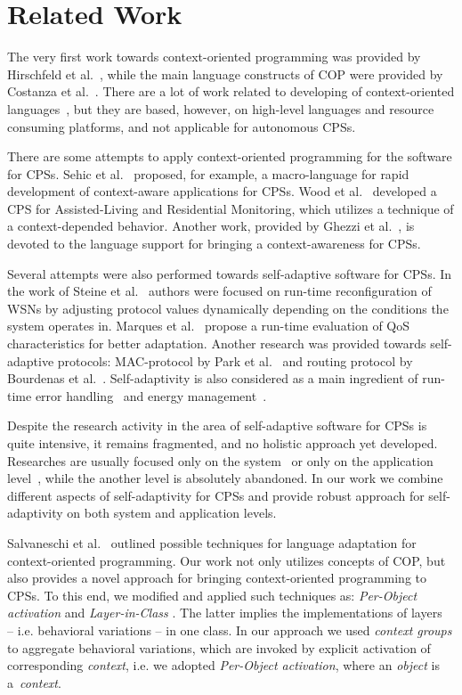 \section{Related Work}
\label{sec:related}

The very first work towards context-oriented programming was provided by
Hirschfeld et al.~\cite{Hirschfeld08}, while the main language constructs of COP
were provided by Costanza et al.~\cite{Costanza11}. There are a lot of work
related to developing of context-oriented
languages~\cite{Sehic11,Kamina11,Bardram05}, but they are based, however, on
high-level languages and resource consuming platforms, and not applicable for
autonomous CPSs.

There are some attempts to apply context-oriented programming for the software
for CPSs. Sehic et al.~\cite{Sehic11} proposed, for example, a macro-language
for rapid development of context-aware applications for CPSs. Wood et
al.~\cite{Wood08} developed a CPS for Assisted-Living and Residential
Monitoring, which utilizes a technique of a context-depended behavior. Another
work, provided by Ghezzi et al.~\cite{Ghezzi10}, is devoted to the language
support for bringing a context-awareness for CPSs.

Several attempts were also performed towards self-adaptive software for CPSs. In
the work of Steine et al.~\cite{Steine11} authors were focused on run-time
reconfiguration of WSNs by adjusting protocol values dynamically depending on
the conditions the system operates in. Marques et al.~\cite{Marques11} propose a
run-time evaluation of QoS characteristics for better adaptation. Another
research was provided towards self-adaptive protocols: MAC-protocol by Park et
al.~\cite{Park08} and routing protocol by Bourdenas et al.~\cite{Bourdenas11}.
Self-adaptivity is also considered as a main ingredient of run-time error
handling~\cite{Bourdenas10} and energy management~\cite{Jiang07}.

Despite the research activity in the area of self-adaptive software for CPSs is
quite intensive, it remains fragmented, and no holistic approach yet developed.
Researches are usually focused only on the
system~\cite{Steine11,Marques11,Park08,Bourdenas11,Bourdenas10,Jiang07} or only
on the application level~\cite{Wood08,Sehic11,Ghezzi10}, while the another level is
absolutely abandoned. In our work we combine different aspects of
self-adaptivity for CPSs and provide robust approach for self-adaptivity on both
system and application levels.

Salvaneschi et al.~\cite{Salvaneschi11,Salvaneschi12} outlined possible
techniques for language adaptation for context-oriented programming. Our work
not only utilizes concepts of COP, but also provides a novel approach for
bringing context-oriented programming to CPSs. To this end, we modified and
applied such techniques as: \emph{Per-Object activation} and
\emph{Layer-in-Class} \cite{Salvaneschi12}. The latter implies the
implementations of layers~\cite{Costanza11} -- i.e. behavioral variations -- in
one class. In our approach we used \emph{context groups} to aggregate behavioral
variations, which are invoked by explicit activation of corresponding
\emph{context}, i.e. we adopted \emph{Per-Object activation}, where an
\emph{object} is a~\emph{context}.

